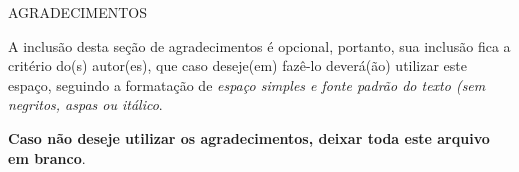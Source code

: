 
\newpage
\thispagestyle{plain}
\begin{center}
    \Large
    AGRADECIMENTOS
\end{center}

\justifying
A inclusão desta seção de agradecimentos é opcional, portanto, sua inclusão 
fica a critério do(s) autor(es), que caso deseje(em) fazê-lo deverá(ão) 
utilizar este espaço, seguindo a formatação de \textit{espaço simples e 
fonte padrão do texto (sem negritos, aspas ou itálico}.

\textbf{Caso não deseje utilizar os agradecimentos, deixar toda este arquivo
em branco}.

\newpage